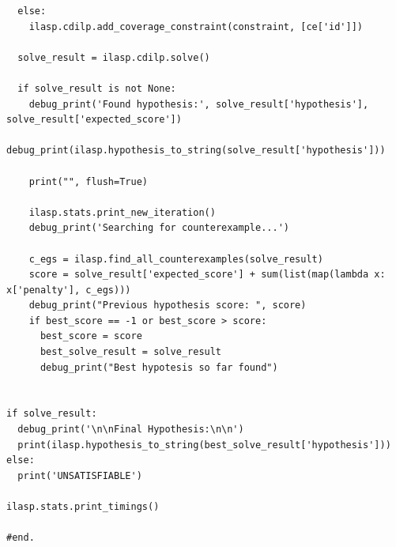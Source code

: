 \begin{lstlisting}
  else:
    ilasp.cdilp.add_coverage_constraint(constraint, [ce['id']])

  solve_result = ilasp.cdilp.solve()

  if solve_result is not None:
    debug_print('Found hypothesis:', solve_result['hypothesis'], solve_result['expected_score'])
    debug_print(ilasp.hypothesis_to_string(solve_result['hypothesis']))
    
    print("", flush=True)

    ilasp.stats.print_new_iteration()
    debug_print('Searching for counterexample...')

    c_egs = ilasp.find_all_counterexamples(solve_result)
    score = solve_result['expected_score'] + sum(list(map(lambda x: x['penalty'], c_egs)))
    debug_print("Previous hypothesis score: ", score)
    if best_score == -1 or best_score > score:
      best_score = score
      best_solve_result = solve_result
      debug_print("Best hypotesis so far found")


if solve_result:
  debug_print('\n\nFinal Hypothesis:\n\n')
  print(ilasp.hypothesis_to_string(best_solve_result['hypothesis']))
else:
  print('UNSATISFIABLE')

ilasp.stats.print_timings()

#end.

\end{lstlisting}

